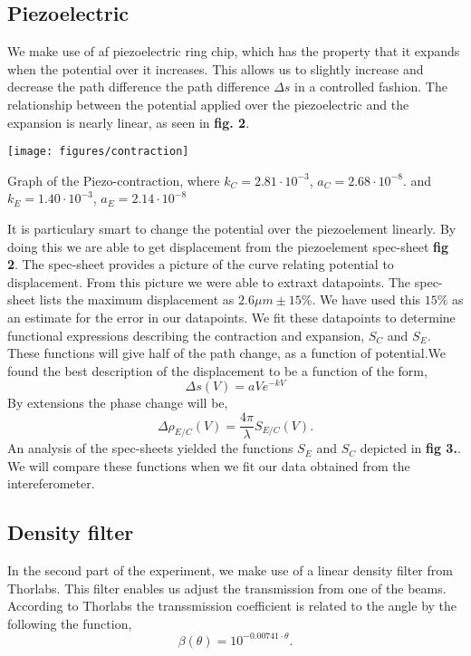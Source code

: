 \documentclass[working, oneside]{inputs/tuftebook}
\begin{document}
\subsection*{Piezoelectric}
We make use of af piezoelectric ring chip, which has the property that it expands when the potential over it increases. This allows us to slightly increase and decrease the path difference the path difference $\Delta s$ in a controlled fashion. The relationship between the potential applied over the piezoelectric and the expansion is nearly linear, as seen in \textbf{fig. 2}. 
\begin{marginfigure}
	\centering
	\texttt{[image: figures/contraction]}
	\caption{Graph of the Piezo-contraction, where $k_C = 2.81\cdot 10^{-3}$,  $a_C = 2.68 \cdot 10^{-8}$. and \\$k_E = 1.40 \cdot 10^{-3}$, $a_E = 2.14 \cdot 10^{-8}$}
	\label{fig:}
\end{marginfigure}
It is particulary smart to change the potential over the piezoelement linearly. By doing this we are able to get displacement from the piezoelement spec-sheet \textbf{fig 2}. The spec-sheet provides a picture of the curve relating potential to displacement. From this picture we were able to extraxt datapoints. The spec-sheet lists the maximum displacement as $2.6 \mu m \pm 15\%$. We have used this $15\%$ as an estimate for the error in our datapoints. We fit these datapoints to determine functional expressions describing the contraction and expansion, $S_C$ and $S_E$. These functions will give half of the path change, as a function of potential.We found the best description of the displacement to be a function of the form,
\[
\Delta s \left( V \right)  = aV e^{-kV}
\]
By extensions the phase change will be,
 \[
\Delta \rho_{E /C} \left( V \right) =  \frac{4\pi}{\lambda}S_{E /C}\left( V \right) 
.\] 
An analysis of the spec-sheets yielded the functions $S_E$ and  $S_C$ depicted in \textbf{fig 3.}. We will compare these functions when we fit our data obtained from the intereferometer.
\subsection*{Density filter}
In the second part of the experiment, we make use of a linear density filter from Thorlabs. This filter enables us adjust the transmission from one of the beams. According to Thorlabs the transsmission coefficient is related to the angle by the following the function,
\[
\beta\left( \theta  \right) = 10^{-0.00741 \cdot \theta }
.\] 
\end{document}
